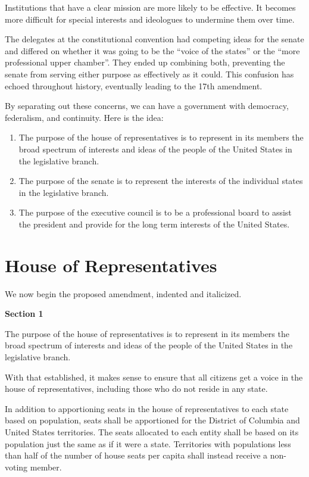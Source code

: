 \documentclass{article}
\begin{document}
Institutions that have a clear mission are more likely to be effective. It becomes more difficult for special interests and ideologues to undermine them over time.

The delegates at the constitutional convention had competing ideas for the senate and differed on whether it was going to be the “voice of the states” or the “more professional upper chamber”. They ended up combining both, preventing the senate from serving either purpose as effectively as it could. This confusion has echoed throughout history, eventually leading to the 17th amendment.

By separating out these concerns, we can have a government with democracy, federalism, and continuity. Here is the idea:
\begin{enumerate}[I]
\item The purpose of the house of representatives is to represent in its members the broad spectrum of interests and ideas of the people of the United States in the legislative branch.
\item The purpose of the senate is to represent the interests of the individual states in the legislative branch.
\item The purpose of the executive council is to be a professional board to assist the president and provide for the long term interests of the United States.
\end{enumerate}

\section{House of Representatives}

We now begin the proposed amendment, indented and italicized.

\begin{quoting}
\textbf{Section 1}

The purpose of the house of representatives is to represent in its members the broad spectrum of interests and ideas of the people of the United States in the legislative branch.
\end{quoting}

With that established, it makes sense to ensure that all citizens get a voice in the house of representatives, including those who do not reside in any state.

\begin{quoting}
In addition to apportioning seats in the house of representatives to each state based on population, seats shall be apportioned for the District of Columbia and United States territories. The seats allocated to each entity shall be based on its population just the same as if it were a state. Territories with populations less than half of the number of house seats per capita shall instead receive a non-voting member.
\end{quoting}
\end{document}
